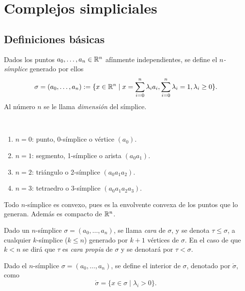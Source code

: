 \documentclass[HS.tex]{subfiles}
\begin{document}

\chapter{Complejos simpliciales}

\section{Definiciones básicas}

\begin{defi}
Dados los puntos $a_0,\dots, a_n\in\mathbb{R}^n$ afínmente independientes, se define el \emph{$n$-símplice} generado por ellos 
$$\sigma=(a_0,\dots, a_n):=\{x\in\mathbb{R}^n\mid x=\sum_{i=0}^n\lambda_ia_i, \sum_{i=0}^n\lambda_i=1,\lambda_i\geq 0\}.$$
Al número $n$ se le llama \emph{dimensión} del símplice.
\end{defi}

\begin{ej}\
\begin{enumerate}
\item $n=0$: punto, 0-símplice o vértice $(a_0)$.
\item $n=1$: segmento, 1-símplice o arista $(a_0a_1)$.
\item $n=2$: triángulo o 2-símplice   $(a_0a_1a_2)$.
\item $n=3$: tetraedro o 3-símplice $(a_0a_1a_2a_3)$.
\end{enumerate}
\end{ej}

\begin{nota}
Todo $n$-símplice es convexo, pues es la envolvente convexa de los puntos que lo generan. Además es compacto de $\mathbb{R}^n$.
\end{nota}

\begin{defi}
Dado un $n$-símplice $\sigma=(a_0,\dots,a_n)$, se llama \emph{cara} de $\sigma$, y se denota $\tau\leq \sigma$, a cualquier $k$-símplice ($k\leq n$) generado por $k+1$ vértices de $\sigma$. En el caso de que $k<n$ se dirá que $\tau$ es \emph{cara propia} de $\sigma$ y se denotará por $\tau<\sigma$.
\end{defi}

\begin{defi}
Dado el $n$-símplice $\sigma=(a_0,\dots, a_n)$, se define el interior de $\sigma$, denotado por $\mathring{\sigma}$, como
$$\mathring{\sigma}=\{x\in\sigma\mid \lambda_i>0\}.$$
\end{defi}
\end{document}
